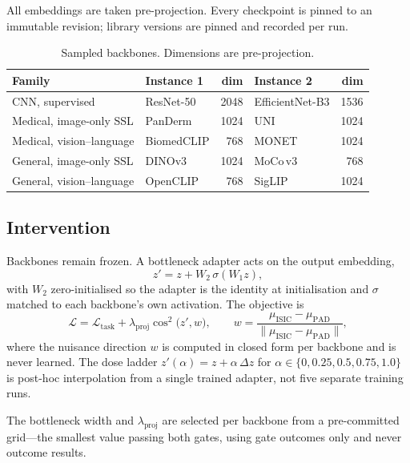 \documentclass[11pt,a4paper]{article}
\begin{document}
All embeddings are taken pre-projection. Every checkpoint is pinned to an
immutable revision; library versions are pinned and recorded per run.

\begin{table}[t]
\centering
\caption{Sampled backbones. Dimensions are pre-projection.}
\label{tab:backbones}
\small
\begin{tabular}{llrlr}
\toprule
Family & Instance 1 & dim & Instance 2 & dim \\
\midrule
CNN, supervised          & ResNet-50   & 2048 & EfficientNet-B3   & 1536 \\
Medical, image-only SSL  & PanDerm     & 1024 & UNI               & 1024 \\
Medical, vision--language& BiomedCLIP  &  768 & MONET             & 1024 \\
General, image-only SSL  & DINOv3      & 1024 & MoCo\,v3          &  768 \\
General, vision--language& OpenCLIP    &  768 & SigLIP            & 1024 \\
\bottomrule
\end{tabular}
\end{table}

\subsection{Intervention}

Backbones remain frozen. A bottleneck adapter acts on the output embedding,
\begin{equation}
  z' = z + W_2\,\sigma(W_1 z),
\end{equation}
with $W_2$ zero-initialised so the adapter is the identity at initialisation and
$\sigma$ matched to each backbone's own activation. The objective is
\begin{equation}
  \mathcal{L} = \mathcal{L}_{\text{task}}
              + \lambda_{\text{proj}}\cos^{2}\!\big(z', w\big),
  \qquad
  w = \frac{\mu_{\text{ISIC}} - \mu_{\text{PAD}}}
           {\lVert \mu_{\text{ISIC}} - \mu_{\text{PAD}} \rVert},
\end{equation}
where the nuisance direction $w$ is computed in closed form per backbone and is
never learned. The dose ladder $z'(\alpha) = z + \alpha\,\Delta z$ for
$\alpha \in \{0, 0.25, 0.5, 0.75, 1.0\}$ is post-hoc interpolation from a single
trained adapter, not five separate training runs.

The bottleneck width and $\lambda_{\text{proj}}$ are selected per backbone from a
pre-committed grid---the smallest value passing both gates, using gate outcomes
only and never outcome results.
\end{document}
